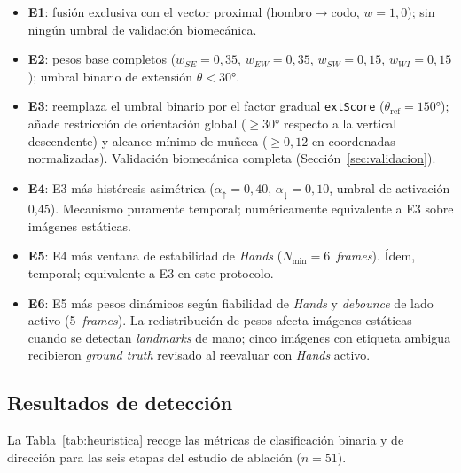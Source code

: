 \documentclass[12pt]{report} %
\begin{document}
\begin{itemize}
  \item \textbf{E1}: fusión exclusiva con el vector proximal (hombro$\to$codo, $w=1{,}0$); sin ningún umbral de validación biomecánica.
  \item \textbf{E2}: pesos base completos ($w_{SE}{=}0{,}35$, $w_{EW}{=}0{,}35$, $w_{SW}{=}0{,}15$, $w_{WI}{=}0{,}15$); umbral binario de extensión $\theta < 30°$.
  \item \textbf{E3}: reemplaza el umbral binario por el factor gradual \texttt{extScore} ($\theta_{\mathrm{ref}}{=}150°$); añade restricción de orientación global (${\geq}30°$ respecto a la vertical descendente) y alcance mínimo de muñeca (${\geq}0{,}12$ en coordenadas normalizadas). Validación biomecánica completa (Sección~\ref{sec:validacion}).
  \item \textbf{E4}: E3 más histéresis asimétrica ($\alpha_{\uparrow}{=}0{,}40$, $\alpha_{\downarrow}{=}0{,}10$, umbral de activación 0,45). Mecanismo puramente temporal; numéricamente equivalente a E3 sobre imágenes estáticas.
  \item \textbf{E5}: E4 más ventana de estabilidad de \textit{Hands} ($N_{\min}{=}6$~\textit{frames}). Ídem, temporal; equivalente a E3 en este protocolo.
  \item \textbf{E6}: E5 más pesos dinámicos según fiabilidad de \textit{Hands} y \textit{debounce} de lado activo (5~\textit{frames}). La redistribución de pesos afecta imágenes estáticas cuando se detectan \textit{landmarks} de mano; cinco imágenes con etiqueta ambigua recibieron \textit{ground truth} revisado al reevaluar con \textit{Hands} activo.
\end{itemize}

\subsection{Resultados de detección}

La Tabla~\ref{tab:heuristica} recoge las métricas de clasificación binaria y de dirección para las seis etapas del estudio de ablación ($n=51$).
\end{document}
